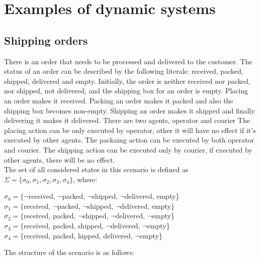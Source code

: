 \documentclass[a4paper]{article}
\begin{document}
\section{Examples of dynamic systems}
\subsection{Shipping orders}
There is an order that needs to be processed and delivered to the customer. The status of an order can be described by the following literals: received, packed, shipped, delivered and empty.
Initially, the order is neither received nor packed, nor shipped, not delivered, and the shipping box for an order is empty.  
Placing an order makes it received. 
Packing an order makes it packed and also the shipping box becomes non-empty.
Shipping an order makes it shipped and finally delivering it makes it delivered.
There are two agents, operator and courier 
The placing action can be only executed by operator, other it will have no effect if it's executed by other agents.
The packaing action can be executed by both operator and courier.
The shipping action can be executed only by courier, if executed by other agents, there will be no effect.
\\
The set of all considered states in this scenario is defined as $\Sigma = \{{\sigma_0, \sigma_1, \sigma_2, \sigma_3, \sigma_4\}}$, where:
\begin{center}
$\sigma_0 = \{${$\neg$received, $\neg$packed, $\neg$shipped, $\neg$delivered, empty}\} \\[0.1\baselineskip]
$\sigma_1 = \{${received, $\neg$packed, $\neg$shipped, $\neg$delivered, empty}\} \\[0.1\baselineskip]
$\sigma_2 = \{${received, packed, $\neg$shipped, $\neg$delivered, $\neg$empty}\} \\[0.1\baselineskip]
$\sigma_3 = \{${received, packed, shipped, $\neg$delivered, $\neg$empty}\} \\[0.1\baselineskip]
$\sigma_4 = \{${received, packed, hipped, delivered, $\neg$empty}\}
\end{center}
The structure of the scenario is as follows:
\end{document}

